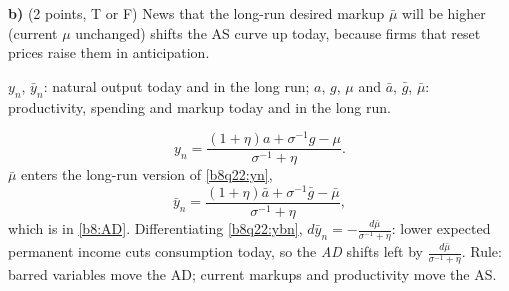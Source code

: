 \medskip
\textbf{b)} (2 points, T or F) News that the long-run desired markup $\bar\mu$ will be higher (current $\mu$ unchanged) shifts the AS curve
up today, because firms that reset prices raise them in anticipation.
\begin{sol}
\begin{notacao}
\item $y_n$, $\bar y_n$: natural output today and in the long run; $a$, $g$, $\mu$ and $\bar a$, $\bar g$, $\bar\mu$: productivity, spending and markup today and in the long run.
\end{notacao}
\begin{equation}
y_n=\frac{(1+\eta)a+\sigma^{-1}g-\mu}{\sigma^{-1}+\eta}. \label{b8q22:yn}
\end{equation}
$\bar\mu$ enters the long-run version of \eqref{b8q22:yn},
\begin{equation}
\bar y_n=\frac{(1+\eta)\bar a+\sigma^{-1}\bar g-\bar\mu}{\sigma^{-1}+\eta}, \label{b8q22:ybn}
\end{equation}
which is in \eqref{b8:AD}. Differentiating \eqref{b8q22:ybn}, $d\bar y_n=-\frac{d\bar\mu}{\sigma^{-1}+\eta}$: lower expected permanent income cuts
consumption today, so the \emph{AD} shifts left by $\frac{d\bar\mu}{\sigma^{-1}+\eta}$. Rule: barred variables move the AD; current markups and
productivity move the AS.
\end{sol}

